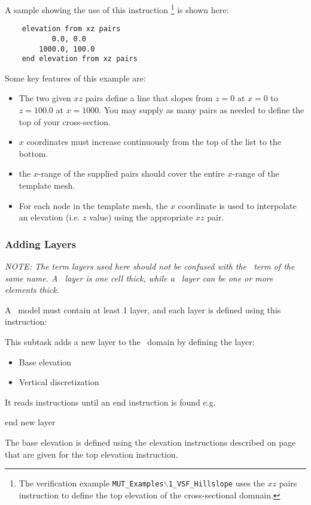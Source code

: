 A sample showing the use of this instruction \footnote{The verification example \texttt{MUT\_Examples$\backslash$1\_VSF\_Hillslope} uses the $xz$ pairs instruction to define the top elevation of the cross-sectional domnain.} is shown here:
    \begin{verbatim}
    elevation from xz pairs
           0.0, 0.0
        1000.0, 100.0
    end elevation from xz pairs
     \end{verbatim}
     \squish
Some key features of this example are:
\begin{itemize}
  \item The two given $xz$ pairs define a line that slopes from $z=0$ at $x=0$ to $z=100.0$ at $x=1000$.  You may supply as many pairs as needed to define the top of your cross-section.
  \item $x$ coordinates must increase continuously from the top of the list to the bottom.
  \item the $x$-range of the supplied pairs should cover the entire $x$-range of the template mesh.
  \item For each node in the template mesh, the $x$ coordinate is used to interpolate an elevation (i.e. $z$ value) using the appropriate $xz$ pair.
\end{itemize}

\subsubsection{Adding Layers} 
    {\em NOTE: The term layers used here should not be confused with the \mf\ term of the same name. A \mf\ layer is one cell thick, while a \mut\ layer can be one or more elements thick.}

A \mfus\ model must contain at least 1 layer, and each layer is defined using this instruction:

    {
    This subtask adds a new layer to the \gwf\ domain by defining the layer:
     \begin{itemize}
       \item Base elevation
       \item Vertical discretization
     \end{itemize}

     It reads instructions until an \textsf{end} instruction is found e.g.\:

    {\Large \sf end new layer}
    }

The base elevation is defined using the elevation instructions  described on page~\pageref{'Page:TopElev'} that are given for the \textsf{top elevation} instruction.

